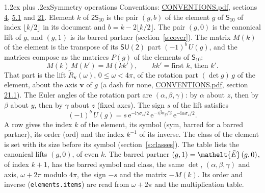 \documentclass[10pt,a4paper]{article}
\makeatletter
\renewcommand\section{\@startsection{section}{1}{\z@}{-3ex plus -1ex minus -.2ex}%
  {1.2ex plus .2ex}{\normalfont\large\sffamily\bfseries\color{parttitle}}}
\numberwithin{equation}{section}
\newcommand{\eltfont}[1]{{\let\sigma\eltsigma\mathelt{#1}}}
\newcommand{\grp}[1]{\mathsf{#1}}
\newcommand{\elt}[1]{\eltfont{#1}}
\newcommand{\vv}{\mathbf{v}}
\newcommand{\iunit}{\mathrm{i}}
\newcommand{\expe}{\mathrm{e}}
\newcommand{\barred}[1]{\bar{#1}}
\newcommand{\lift}[1]{\tilde{#1}}
\newcommand{\pauli}[1]{\sigma_{#1}}
\makeatother
\begin{document}
\section{Symmetry operations}\label{s:elements}
Conventions: \href{../../CONVENTIONS.pdf}{CONVENTIONS.pdf}, sections \href{../../../rotation/CONVENTIONS.pdf\#conv.4}{4}, \href{../../../rotation/CONVENTIONS.pdf\#conv.5.1}{5.1} and \href{../../CONVENTIONS.pdf\#conv.21}{21}.
\leavevmode\label{n:index.element}\label{n:element.g}Element $k$ of $\grp{2S_{10}}$ is the pair $(g, b)$ of the element $g$ of \href{../../../rotation/data/pdf/S10.pdf}{$\grp{S_{10}}$} of index $\lfloor k/2\rfloor$ in its document and $b = k - 2\lfloor k/2\rfloor$. The pair $(g, 0)$ is the canonical lift of $g$, and $(g, 1)$ is its barred partner (section~\ref{s:cover}). \label{n:matrix.element.pin}\label{n:matrix.element}The matrix $M(k)$ of the element is the transpose of its $\grp{SU(2)}$ part $(-1)^{b}\,U(g)$, and the matrices compose as the matrices $P(g)$ of the elements of $\grp{S_{10}}$:
\begin{equation}\label{e:mprod}M(k)\,M(k') = M(kk'),\qquad kk' = \text{first } k\text{, then } k'.\end{equation}
\leavevmode\label{n:angle.omega}\label{n:vector.axis}\label{n:vector.pole}That part is the lift $\lift{R}_{\vv}(\omega)$, $0 \le \omega < 4\pi$, of the rotation part $(\det g)\,g$ of the element, about the axis $\vv$ of $g$ (a dash for none, \href{../../CONVENTIONS.pdf}{CONVENTIONS.pdf}, section \href{../../CONVENTIONS.pdf\#conv.21.1}{21.1}). \label{n:angle.euler.alpha}\label{n:angle.euler.beta}\label{n:angle.euler.gamma}\label{n:vector.coordinates}The Euler angles of the rotation part are $(\alpha,\beta,\gamma)$: by $\alpha$ about $z$, then by $\beta$ about $y$, then by $\gamma$ about $z$ (fixed axes). \label{n:local.euler.sign}The sign $s$ of the lift satisfies
\begin{equation}\label{e:euler}(-1)^{b}\,U(g) = s\,\expe^{-\iunit\gamma\pauli{z}/2}\,\expe^{-\iunit\beta\pauli{y}/2}\,\expe^{-\iunit\alpha\pauli{z}/2}.\end{equation}
\leavevmode\label{n:index.element.inverse}\label{n:head.sym}\label{n:head.ord}A row gives the index $k$ of the element, its symbol (sym, barred for a barred partner), its order (ord) and the index $k^{-1}$ of its inverse. \label{n:head.class}The class of the element is set with its size before its symbol (section~\ref{s:classes}).
The table lists the canonical lifts $(g, 0)$, of even $k$. The barred partner $(g, 1) = \elt{\barred{E}}\,(g, 0)$, of index $k + 1$, has the barred symbol and class, the same $\det$, $(\alpha,\beta,\gamma)$ and axis, $\omega + 2\pi$ modulo $4\pi$, the sign $-s$ and the matrix $-M(k)$. Its order and inverse (\texttt{elements.items}) are read from $\omega + 2\pi$ and the multiplication table.
\end{document}
